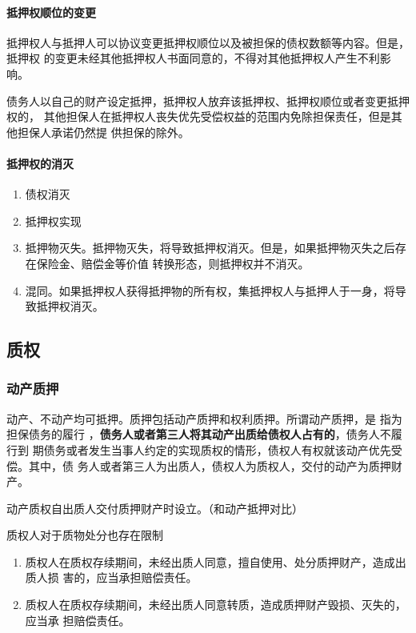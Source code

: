 \documentclass[UTF8,12pt]{ctexart}
\numberwithin{equation}{section} %
\numberwithin{figure}{section}
\numberwithin{table}{section}
\begin{document}
	\paragraph{抵押权顺位的变更} 抵押权人与抵押人可以协议变更抵押权顺位以及被担保的债权数额等内容。但是，抵押权 的变更未经其他抵押权人书面同意的，不得对其他抵押权人产生不利影响。
	
	债务人以自己的财产设定抵押，抵押权人放弃该抵押权、抵押权顺位或者变更抵押权的， 其他担保人在抵押权人丧失优先受偿权益的范围内免除担保责任，但是其他担保人承诺仍然提 供担保的除外。
	
	\paragraph{抵押权的消灭}
	\begin{enumerate}
		\item 债权消灭
		
		\item 抵押权实现
		
		\item 抵押物灭失。抵押物灭失，将导致抵押权消灭。但是，如果抵押物灭失之后存在保险金、赔偿金等价值 转换形态，则抵押权并不消灭。
		
		\item 混同。如果抵押权人获得抵押物的所有权，集抵押权人与抵押人于一身，将导致抵押权消灭。
	\end{enumerate}
	
	
	\subsection{质权}
	
	\subsubsection{动产质押}
	动产、不动产均可抵押。质押包括动产质押和权利质押。所谓动产质押，是 指为担保债务的履行 ，\textbf{债务人或者第三人将其动产出质给债权人占有的}，债务人不履行到 期债务或者发生当事人约定的实现质权的情形，债权人有权就该动产优先受偿。其中，债 务人或者第三人为出质人，债权人为质权人，交付的动产为质押财产。
	
	 动产质权自出质人交付质押财产时设立。（和动产抵押对比）
	 
	质权人对于质物处分也存在限制 
	\begin{enumerate}
		\item 质权人在质权存续期间，未经出质人同意，擅自使用、处分质押财产，造成出质人损 害的，应当承担赔偿责任。
		
		\item 质权人在质权存续期间，未经出质人同意转质，造成质押财产毁损、灭失的，应当承 担赔偿责任。
	\end{enumerate}
	
\end{document}
